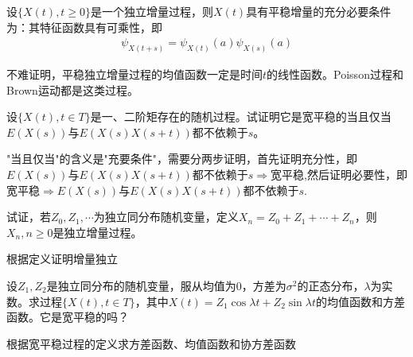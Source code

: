 \begin{theorem}\label{prop:NumFeaofSmoIndIncPro}
	设\(\{X(t),t\geqslant 0\}\)是一个独立增量过程，则\(X(t)\)具有平稳增量的充分必要条件为：其特征函数具有可乘性，即
	\begin{align*}
		\psi_{X(t+s)}=\psi_{X(t)}(a)\psi_{X(s)}(a)
	\end{align*}
\end{theorem}

不难证明，平稳独立增量过程的均值函数一定是时间\(t\)的线性函数。Poisson过程和Brown运动都是这类过程。


\begin{Exercises}
	\item 设\(\{X(t),t\in T\}\)是一、二阶矩存在的随机过程。试证明它是宽平稳的当且仅当\(E(X(s))\)与\(E(X(s)X(s+t))\)都不依赖于\(s\)。\begin{hint}"当且仅当"的含义是"充要条件"，需要分两步证明，首先证明充分性，即\(E(X(s))\)与\(E(X(s)X(s+t))\)都不依赖于\(s\Rightarrow\)宽平稳,然后证明必要性，即宽平稳\(\Rightarrow  E(X(s))\)与\(E(X(s)X(s+t))\)都不依赖于\(s\).\end{hint}
	\newpage
	\item 试证，若\(Z_0,Z_1,\cdots\)为独立同分布随机变量，定义\(X_n=Z_0+Z_1+\cdots+Z_n\)，则\({X_n,n\geqslant0}\)是独立增量过程。\begin{hint}根据定义证明增量独立\end{hint}
	\vspace{25em}
	\item 设\(Z_1,Z_2\)是独立同分布的随机变量，服从均值为0，方差为\(\sigma^2\)的正态分布，\(\lambda\)为实数。求过程\(\{X(t),t\in T\}\)，其中\(X(t)=Z_1\cos \lambda t+Z_2 \sin \lambda t\)的均值函数和方差函数。它是宽平稳的吗？\begin{hint}根据宽平稳过程的定义求方差函数、均值函数和协方差函数\end{hint}
	\vspace{10em}
\end{Exercises}